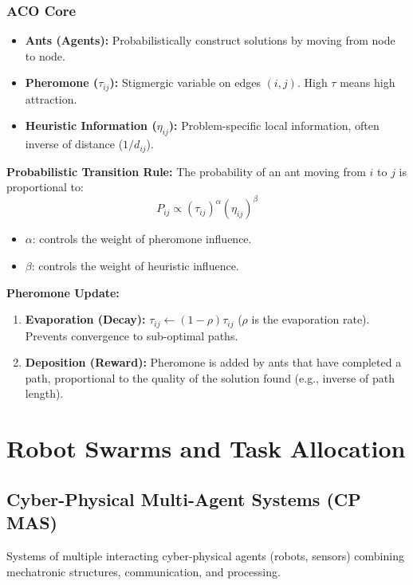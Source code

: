 \documentclass{report}
\begin{document}
\subsection*{ACO Core}
\begin{itemize}
    \item \textbf{Ants (Agents):} Probabilistically construct solutions by moving from node to node.
    \item \textbf{Pheromone ($\tau_{ij}$):} Stigmergic variable on edges $(i, j)$. High $\tau$ means high attraction.
    \item \textbf{Heuristic Information ($\eta_{ij}$):} Problem-specific local information, often inverse of distance ($1/d_{ij}$).
\end{itemize}

\textbf{Probabilistic Transition Rule:} The probability of an ant moving from $i$ to $j$ is proportional to:
\[
P_{ij} \propto (\tau_{ij})^\alpha (\eta_{ij})^\beta
\]
\begin{itemize}
    \item $\alpha$: controls the weight of pheromone influence.
    \item $\beta$: controls the weight of heuristic influence.
\end{itemize}

\textbf{Pheromone Update:}
\begin{enumerate}
    \item \textbf{Evaporation (Decay):} $\tau_{ij} \leftarrow (1-\rho) \tau_{ij}$ ($\rho$ is the evaporation rate). Prevents convergence to sub-optimal paths.
    \item \textbf{Deposition (Reward):} Pheromone is added by ants that have completed a path, proportional to the quality of the solution found (e.g., inverse of path length).
\end{enumerate}

\chapter*{Robot Swarms and Task Allocation}

\section*{Cyber-Physical Multi-Agent Systems (CP MAS)}
Systems of multiple interacting cyber-physical agents (robots, sensors) combining mechatronic structures, communication, and processing.
\end{document}
